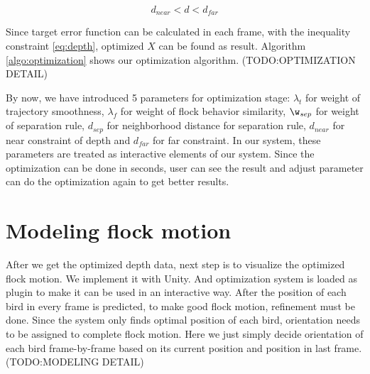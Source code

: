 \begin{equation}\label{eq:depth}
d_{near} < d < d_{far}
\end{equation}

Since target error function can be calculated in each frame, with the inequality constraint \ref{eq:depth}, optimized $X$ can be found as result.  Algorithm \ref{algo:optimization}  shows our optimization algorithm.
(TODO:OPTIMIZATION DETAIL)


By now, we have introduced 5 parameters for optimization stage: $\lambda_{t}$ for weight of trajectory smoothness, $\lambda_{f}$ for weight of flock behavior similarity, $\w_{sep}$ for weight of separation rule, $d_{sep}$ for neighborhood distance for separation rule, $d_{near}$ for near constraint of depth and $d_{far}$ for far constraint. In our system, these parameters are treated as interactive elements of our system. Since the optimization can be done in seconds, user can see the result and adjust parameter can do the optimization again to get better results. 


\section{Modeling flock motion}


After we get the optimized depth data, next step is to visualize the optimized flock motion. We implement it with Unity\cite{Unity}. And optimization system is loaded as plugin to make it can be used in an interactive way.
After the position of each bird in every frame is predicted, to make good flock motion, refinement must be done. Since the system only finds optimal position of each bird, orientation needs to be assigned to complete flock motion. Here we just simply decide orientation of each bird frame-by-frame based on its current position and position in last frame.
(TODO:MODELING DETAIL)

